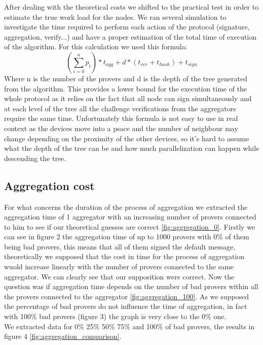 After dealing with the theoretical costs we shifted to the practical test in order to estimate the true work load for the nodes.
We ran several simulation to investigate the time required to perform each action of the protocol (signature, aggregation, verify...) and have a proper estimation of the total time of execution of the algorithm.
For this calculation we used this formula:
\[(\sum_{i=0}^{n} p_i) * t_{agg} + d * (t_{ver} + t_{hash}) + t_{sign} \]
Where n is the number of the provers and d is the depth of the tree generated from the algorithm.
This provides a lower bound for the execution time of the whole protocol as it relies on the fact that all node can sign simultaneously and at each level of the tree all the challenge verifications from the aggregators require the same time.
Unfortunately this formula is not easy to use in real context as the devices move into a psace and the number of neighbour may change depending on the proximity of the other devices, so it's hard to assume what the depth of the tree can be and how much parallelization can happen while descending the tree.


\subsection{Aggregation cost}
For what concerns the duration of the process of aggregation we extracted the aggregation time of 1 aggregator with an increasing number of provers connected to him to see if our theoretical guesses are correct \ref{fig:aggregation_0}.
Firstly we can see in figure 2 the aggregation time of up to 1000 provers with 0\% of them being bad provers, this means that all of them signed the default message, theoretically we supposed that the cost in time 
for the process of aggregation wuold increase linearly with the number of provers connected to the same aggregator. We can clearly see that our supposition were correct.
Now the question was if aggregation time depends on the number of bad provers within all the provers connected to the aggregator \ref{fig:aggregation_100}.
As we supposed the percentage of bad provers do not influence the time of aggregation, in fact with 100\% bad provers (figure 3) the graph is very close to the 0\% one.\\ 
We extracted data for 0\% 25\% 50\% 75\% and 100\% of bad provers, the results in figure 4 \ref{fig:aggregation_comparison}.

